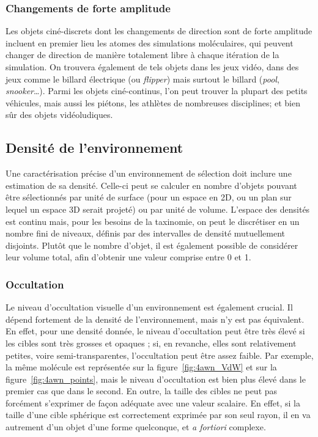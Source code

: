 	\subsubsection{Changements de forte amplitude}
	Les objets ciné-discrets dont les changements de direction sont de forte amplitude incluent en premier lieu les atomes des simulations moléculaires, qui peuvent changer de direction de manière totalement libre à chaque itération de la simulation. On trouvera également de tels objets dans les jeux vidéo, dans des jeux comme le billard électrique (ou \emph{flipper}) mais surtout le billard (\emph{pool}, \emph{snooker}\ldots{}). Parmi les objets ciné-continus, l'on peut trouver la plupart des petits véhicules, mais aussi les piétons, les athlètes de nombreuses disciplines; et bien sûr des objets vidéoludiques.


	\subsection{Densité de l'environnement}
	Une caractérisation précise d'un environnement de sélection doit inclure une estimation de sa densité. Celle-ci peut se calculer en nombre d'objets pouvant être sélectionnés par unité de surface (pour un espace en 2D, ou un plan sur lequel un espace 3D serait projeté) ou par unité de volume. L'espace des densités est continu mais, pour les besoins de la taxinomie, on peut le discrétiser en un nombre fini de niveaux, définis par des intervalles de densité mutuellement disjoints. Plutôt que le nombre d'objet, il est également possible de considérer leur volume total, afin d'obtenir une valeur comprise entre 0 et 1.
	
	\FloatBarrier \subsubsection{Occultation}
	Le niveau d'occultation visuelle d'un environnement est également crucial. Il dépend fortement de la densité de l'environnement, mais n'y est pas équivalent. En effet, pour une densité donnée, le niveau d'occultation peut être très élevé si les cibles sont très grosses et opaques ; si, en revanche, elles sont relativement petites, voire semi-transparentes, l'occultation peut être assez faible. Par exemple, la même molécule est représentée sur la figure~\ref{fig:4awn_VdW} et sur la figure~\ref{fig:4awn_points}, mais le niveau d'occultation est bien plus élevé dans le premier cas que dans le second. En outre, la \og taille \fg{} des cibles ne peut pas forcément s'exprimer de façon adéquate avec une valeur scalaire. En effet, si la taille d'une cible sphérique est correctement exprimée par son seul rayon, il en va autrement d'un objet d'une forme quelconque, et \emph{a fortiori} complexe.
	
